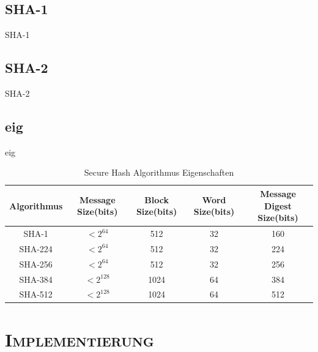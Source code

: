 \documentclass[xcolor=x11names,compress]{beamer}
\renewcommand{\(}{\begin{columns}}
\renewcommand{\)}{\end{columns}}
\newcommand{\<}[1]{\begin{column}{#1}}
\renewcommand{\>}{\end{column}}
\begin{document}
\subsection{SHA-1}
\begin{frame}{SHA-1}

\end{frame}


\subsection{SHA-2}
\begin{frame}{SHA-2}

\end{frame}

\subsection{eig}
\begin{frame}[shrink=35]{eig}
\begin{table}[c]
\caption{Secure Hash Algorithmus Eigenschaften}
\begin{tabular}[ht]{|c|c|c|c|c|}
  \hline
  Algorithmus & Message Size(bits) & Block Size(bits) & Word Size(bits) & Message Digest Size(bits)\\
  \hline\hline
  SHA-1   & $<2^{64}$  &  512 & 32 & 160\\
  SHA-224 & $<2^{64}$  &  512 & 32 & 224\\
  SHA-256 & $<2^{64}$  &  512 & 32 & 256\\
  SHA-384 & $<2^{128}$ & 1024 & 64 & 384\\  
  SHA-512 & $<2^{128}$ & 1024 & 64 & 512\\  
  \hline
\end{tabular}
\label{tab:meinetabelle}
\end{table}
\end{frame}


\section{\scshape Implementierung}
\end{document}
